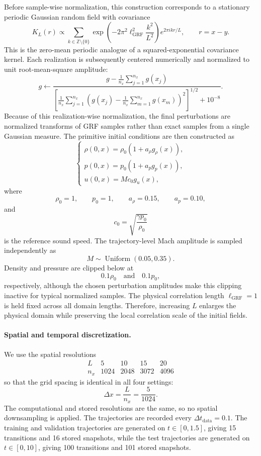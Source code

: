 \documentclass[11pt]{article}
\begin{document}
Before sample-wise normalization, this construction corresponds to a stationary periodic Gaussian random field with covariance
\[
    K_L(r)
    \propto
    \sum_{k\in\mathbb{Z}\setminus\{0\}}
    \exp\left(
        -2\pi^2\ell_{\mathrm{GRF}}^2
        \frac{k^2}{L^2}
    \right)
    e^{2\pi i kr/L},
    \qquad
    r=x-y.
\]
This is the zero-mean periodic analogue of a squared-exponential covariance kernel. Each realization is subsequently centered numerically and normalized to unit root-mean-square amplitude:
\[
    g
    \leftarrow
    \frac{
        g-\frac{1}{n_x}\sum_{j=1}^{n_x}g(x_j)
    }{
        \left[
            \frac{1}{n_x}
            \sum_{j=1}^{n_x}
            \left(
                g(x_j)
                -
                \frac{1}{n_x}\sum_{m=1}^{n_x}g(x_m)
            \right)^2
        \right]^{1/2}
        +10^{-8}
    }.
\]
Because of this realization-wise normalization, the final perturbations are normalized transforms of GRF samples rather than exact samples from a single Gaussian measure. The primitive initial conditions are then constructed as
\[
\begin{cases}
\rho(0,x)
    =
    \rho_0
    \left(
        1+a_\rho g_\rho(x)
    \right),\\
    p(0,x)
    =
    p_0
    \left(
        1+a_p g_p(x)
    \right),\\
    u(0,x)
    =
    M c_0 g_u(x),
\end{cases}
\]
where
\[
    \rho_0=1,
    \qquad
    p_0=1,
    \qquad
    a_\rho=0.15,
    \qquad
    a_p=0.10,
\]
and
\[
    c_0
    =
    \sqrt{\frac{\gamma p_0}{\rho_0}}
\]
is the reference sound speed. The trajectory-level Mach amplitude is sampled independently as
\[
    M\sim\operatorname{Uniform}(0.05,0.35).
\]
Density and pressure are clipped below at
\[
    0.1\rho_0
    \quad\text{and}\quad
    0.1p_0,
\]
respectively, although the chosen perturbation amplitudes make this clipping inactive for typical normalized samples. The physical correlation length $\ell_{\mathrm{GRF}}=1$ is held fixed across all domain lengths. Therefore, increasing $L$ enlarges the physical domain while preserving the local correlation scale of the initial fields.

\paragraph{Spatial and temporal discretization.}
We use the spatial resolutions
\[
\begin{array}{c|cccc}
    L & 5 & 10 & 15 & 20\\
    \hline
    n_x & 1024 & 2048 & 3072 & 4096
\end{array}
\]
so that the grid spacing is identical in all four settings:
\[
    \Delta x
    =
    \frac{L}{n_x}
    =
    \frac{5}{1024}.
\]
The computational and stored resolutions are the same, so no spatial downsampling is applied. The trajectories are recorded every $\Delta t_{\mathrm{data}}=0.1$. The training and validation trajectories are generated on $t\in[0,1.5]$,
giving 15 transitions and 16 stored snapshots, while the test trajectories are generated on $t\in[0,10]$, giving 100 transitions and 101 stored snapshots.
\end{document}
